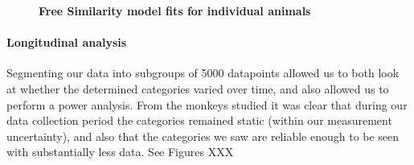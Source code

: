 \begin{figure}
    \centering
    \begin{subfigure}[b]{0.49\textwidth}
         \centering
         \caption{}
         
         \label{fig:SimilarityMatrixPollux}
    \end{subfigure}
    \hfill
    \begin{subfigure}[b]{0.49\textwidth}
         \centering
         \caption{}
             
         \label{fig:SimilarityMatrixCastor}
    \end{subfigure}
    
    \begin{subfigure}[b]{0.49\textwidth}
         \centering
         \caption{}
             
         \label{fig:SimilarityMatrixBuster}
     \end{subfigure}
     \hfill
     \begin{subfigure}[b]{0.49\textwidth}
         \centering
         \caption{}
             
         \label{fig:SimilarityMatrixMorty}
     \end{subfigure}
        \caption{\textbf{Free Similarity model fits for individual animals} }
        \label{fig:SimilarityMatrixIndividual}
\end{figure}


\paragraph{Longitudinal analysis}

Segmenting our data into subgroups of 5000 datapoints allowed us to both look at whether the determined categories varied over time, and also allowed us to perform a power analysis. From the monkeys studied it was clear that during our data collection period the categories remained static (within our measurement uncertainty), and also that the categories we saw are reliable enough to be seen with substantially less data. See Figures XXX %